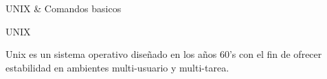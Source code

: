\documentclass{beamer}
\begin{document}

\begin{frame}
\begin{Huge}
\begin{center}
\textrm{UNIX \& Comandos basicos}
\end{center}

\end{Huge}
\end{frame}



\begin{frame}{\textsc{UNIX}}

{\LARGE \textrm{Unix es un sistema operativo dise\~nado en los a\~nos 60's con el fin de ofrecer estabilidad en ambientes multi-usuario y multi-tarea.}}

\end{frame}

\end{document}

